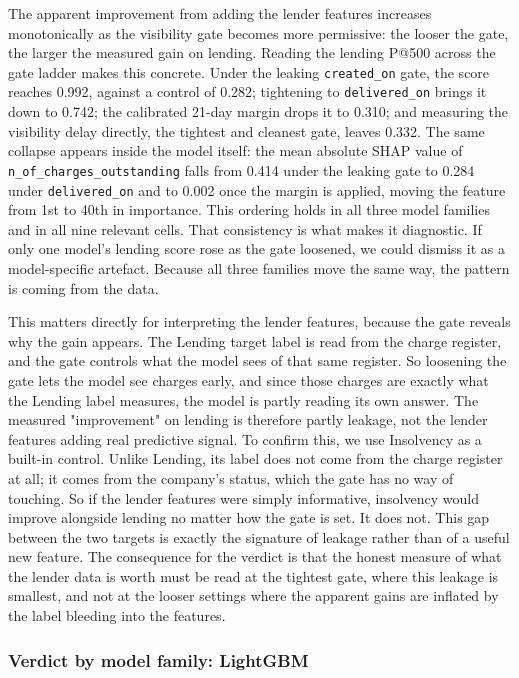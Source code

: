 \documentclass[    author={Samuel Menon Demelo; Sneha Saphala Ram Prasad; 
Viktor Ander Lindholm; Vishal Khatri},
               supervisor={Prof. Fernando Moreno-Pino},
                   degree={MSc},
                    title={Lloyds Commercial Banking Intelligence},
                 subtitle={Ranking SME Lending, Risk and Growth Prospects for Lloyds Banking Group},
                     type={},
                     year={2026}]{dissertation}
\begin{document}
The apparent improvement from adding the lender features increases monotonically as the visibility gate becomes more permissive: the looser the gate, the larger the measured gain on lending. Reading the lending P@500 across the gate ladder makes this concrete. Under the leaking \texttt{created\_on} gate, the score reaches 0.992, against a control of 0.282; tightening to \texttt{delivered\_on} brings it down to 0.742; the calibrated 21-day margin drops it to 0.310; and measuring the visibility delay directly, the tightest and cleanest gate, leaves 0.332. The same collapse appears inside the model itself: the mean absolute SHAP value of \texttt{n\_of\_charges\_outstanding} falls from 0.414 under the leaking gate to 0.284 under \texttt{delivered\_on} and to 0.002 once the margin is applied, moving the feature from 1st to 40th in importance. This ordering holds in all three model families and in all nine relevant cells. That consistency is what makes it diagnostic. If only one model's lending score rose as the gate loosened, we could dismiss it as a model-specific artefact. Because all three families move the same way, the pattern is coming from the data.

This matters directly for interpreting the lender features, because the gate reveals why the gain appears. The Lending target label is read from the charge register, and the gate controls what the model sees of that same register. So loosening the gate lets the model see charges early, and since those charges are exactly what the Lending label measures, the model is partly reading its own answer. The measured "improvement" on lending is therefore partly leakage, not the lender features adding real predictive signal. To confirm this, we use Insolvency as a built-in control. Unlike Lending, its label does not come from the charge register at all; it comes from the company's status, which the gate has no way of touching. So if the lender features were simply informative, insolvency would improve alongside lending no matter how the gate is set. It does not. This gap between the two targets is exactly the signature of leakage rather than of a useful new feature. The consequence for the verdict is that the honest measure of what the lender data is worth must be read at the tightest gate, where this leakage is smallest, and not at the looser settings where the apparent gains are inflated by the label bleeding into the features.

\subsubsection{Verdict by model family: LightGBM}
\end{document}
